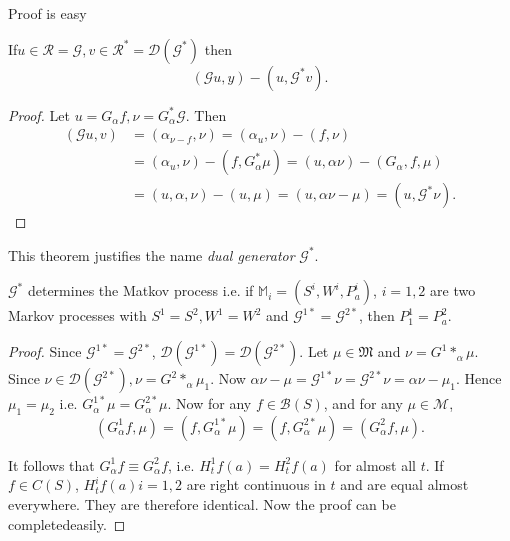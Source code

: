Proof is easy 
\begin{thm}\label{chap1-sec8-thm5}%
If\pageoriginale $u \in \mathscr{R} = \mathscr{G}, v \in \mathscr{R}^* =
  \mathscr{D}(\mathscr{G}^*)$ then  
  $$
  (\mathscr{G} u, y ) - (u, \mathscr{G}^* v).
  $$
\end{thm}

\begin{proof}
Let $u = G_\alpha f, \nu = G^* _\alpha \mathscr{G}$. Then 
\begin{align*}
     (\mathscr{G} u, v ) & = (\alpha_{\nu - f}, \nu) = (\alpha_{u}, \nu) -
    (f, \nu)\\ 
    & = (\alpha_{u}, \nu ) - (f, G^*_\alpha \mu ) = (u, \alpha \nu) -
    (G_\alpha , f,\mu)\\ 
    & = (u, \alpha, \nu) - (u,\mu) = (u, \alpha \nu - \mu) = (u,
    \mathscr{G}^* \nu).  
\end{align*}
\end{proof} 
 
This theorem justifies the name \textit{dual generator} $\mathscr{G}^*$. 
\begin{thm}\label{chap1-sec8-thm6}%
  $\mathscr{G}^*$ determines the Matkov process i.e. if $\mathbb{M}_{i} =
  (S^i , W^i, P^i_a)$, $i = 1, 2$ are two Markov processes with $S^1 =
  S^2 , W^1 = W^2 $ and $\mathscr{G}^{1*} = \mathscr{G}^{2*}$, then
  $P^1 _1 = P^2_a$.  
\end{thm}

\begin{proof}%
Since $\mathscr{G}^{1*} = \mathscr{G}^{2*}$,
  $\mathscr{D}(\mathscr{G}^{1*}) = \mathscr{D}(\mathscr{G}^{2*})$. Let
  $\mu \in \mathfrak{M} $ and $\nu = G^1*_\alpha \mu$. Since $\nu \in
  \mathscr{D}(\mathscr{G}^{2*}), \nu = G^2*_{\alpha}\mu_1$. 
Now $\alpha \nu - \mu = \mathscr{G}^{1*} \nu = \mathscr{G}^{2*}\nu =
\alpha \nu - \mu_1$. Hence $\mu_1 = \mu_2$ i.e. $G^{1*}_\alpha \mu  =
  G^{2*}_\alpha \mu$. Now for any $f \in \mathscr{B}(S)$, and for any
  $\mu \in \mathscr{M}$,  
  $$
  (G^1 _\alpha  f, \mu ) = (f, G^{1*}_\alpha \mu) = (f, G^{ 2*}_\alpha
  \mu) = (G^2_\alpha f, \mu). 
  $$

  It follows that $G^1 _\alpha f \equiv G^2_\alpha  f$, i.e. $H^1 _t
  f(a) = H^2 _t f(a)$ for almost all $t$. If $f \in C (S)$, $H^i_t f(a)
  i = 1, 2$ are right continuous in $t$ and are equal almost
  everywhere. They are therefore identical. Now the proof can be
  completed\pageoriginale easily.  
\end{proof} 

